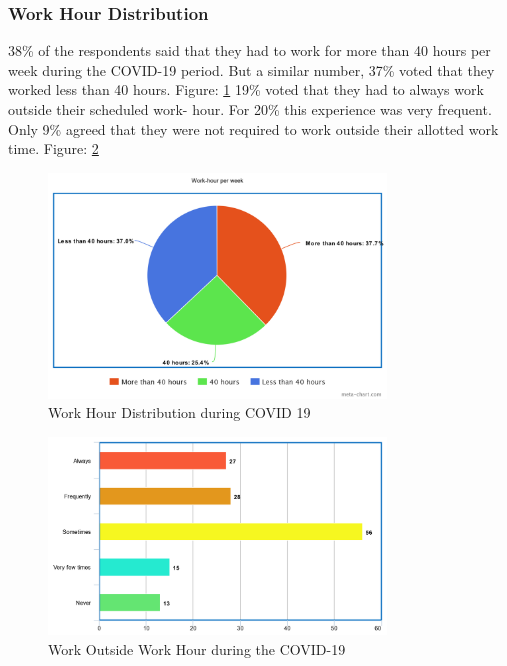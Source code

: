 \documentclass[11pt]{article}
\begin{document}
\subsubsection{Work Hour Distribution}
38\% of the respondents said that they had to work for more than 40 hours per week during the COVID-19 period. But a similar number, 37\% voted that they worked less than 40 hours. Figure: \ref{Work Hour}
19\% voted that they had to always work outside their scheduled work- hour.  For 20\% this experience was very frequent. Only 9\% agreed that they were not required to work outside their allotted work time. Figure: \ref{Outside Work Hour}
\newpage
\begin{figure}[!ht]
	\centering
	\includegraphics[width=0.8\textwidth]{Images/Work Life/Work Hour.png}
	\caption{Work Hour Distribution during COVID 19}
	\centering
	\label{Work Hour}
\end{figure}
\begin{figure}[!ht]
	\centering
	\includegraphics[width=0.8\textwidth]{Images/Work Life/Outside Work Hour.png}
	\caption{Work Outside Work Hour during the COVID-19}
	\centering
	\label{Outside Work Hour}
\end{figure}
\end{document}
